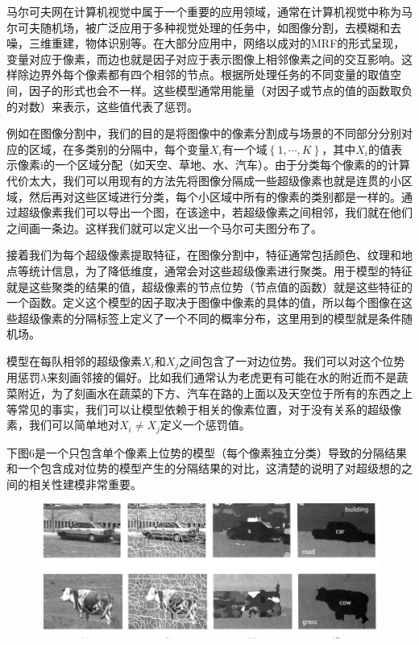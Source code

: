 \documentclass{article} %
\begin{document}
\begin{CJK*}{UTF8}{gkai}
马尔可夫网在计算机视觉中属于一个重要的应用领域，通常在计算机视觉中称为马尔可夫随机场，被广泛应用于多种视觉处理的任务中，如图像分割，去模糊和去噪，三维重建，物体识别等。在大部分应用中，网络以成对的MRF的形式呈现，变量对应于像素，而边也就是因子对应于表示图像上相邻像素之间的交互影响。这样除边界外每个像素都有四个相邻的节点。根据所处理任务的不同变量的取值空间，因子的形式也会不一样。这些模型通常用能量（对因子或节点的值的函数取负的对数）来表示，这些值代表了惩罚。

例如在图像分割中，我们的目的是将图像中的像素分割成与场景的不同部分分别对应的区域，在多类别的分隔中，每个变量$X_{i}$有一个域$\left\lbrace 1,\cdots,K\right\rbrace$，其中$X_{i}$的值表示像素i的一个区域分配（如天空、草地、水、汽车）。由于分类每个像素的的计算代价太大，我们可以用现有的方法先将图像分隔成一些超级像素也就是连贯的小区域，然后再对这些区域进行分类，每个小区域中所有的像素的类别都是一样的。通过超级像素我们可以导出一个图，在该途中，若超级像素之间相邻，我们就在他们之间画一条边。这样我们就可以定义出一个马尔可夫图分布了。

接着我们为每个超级像素提取特征，在图像分割中，特征通常包括颜色、纹理和地点等统计信息，为了降低维度，通常会对这些超级像素进行聚类。用于模型的特征就是这些聚类的结果的值，超级像素的节点位势（节点值的函数）就是这些特征的一个函数。定义这个模型的因子取决于图像中像素的具体的值，所以每个图像在这些超级像素的分隔标签上定义了一个不同的概率分布，这里用到的模型就是条件随机场。

模型在每队相邻的超级像素$X_{i}$和$X_{j}$之间包含了一对边位势。我们可以对这个位势用惩罚$\lambda $来刻画邻接的偏好。比如我们通常认为老虎更有可能在水的附近而不是蔬菜附近，为了刻画水在蔬菜的下方、汽车在路的上面以及天空位于所有的东西之上等常见的事实，我们可以让模型依赖于相关的像素位置，对于没有关系的超级像素，我们可以简单地对$X_{i}\neq X_{j}$定义一个惩罚值。

下图6是一个只包含单个像素上位势的模型（每个像素独立分类）导致的分隔结果和一个包含成对位势的模型产生的分隔结果的对比，这清楚的说明了对超级想的之间的相关性建模非常重要。
\begin{figure}[h]
\begin{center}

\includegraphics[width=6in]{6.png}


\end{center}
\end{figure}
\end{CJK*}
\end{document}
